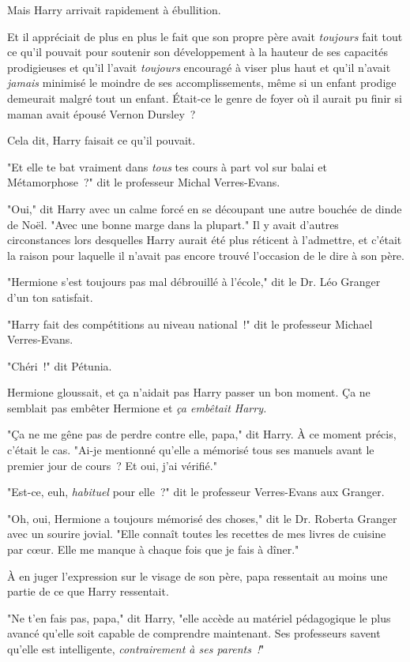 Mais Harry arrivait rapidement à ébullition.

Et il appréciait de plus en plus le fait que son propre père avait \emph{toujours} fait tout ce qu'il pouvait pour soutenir son développement à la hauteur de ses capacités prodigieuses et qu'il l'avait \emph{toujours} encouragé à viser plus haut et qu'il n'avait \emph{jamais} minimisé le moindre de ses accomplissements, même si un enfant prodige demeurait malgré tout un enfant. Était-ce le genre de foyer où il aurait pu finir si maman avait épousé Vernon Dursley~?

Cela dit, Harry faisait ce qu'il pouvait.

"Et elle te bat vraiment dans \emph{tous} tes cours à part vol sur balai et Métamorphose~?" dit le professeur Michal Verres-Evans.

"Oui," dit Harry avec un calme forcé en se découpant une autre bouchée de dinde de Noël. "Avec une bonne marge dans la plupart." Il y avait d'autres circonstances lors desquelles Harry aurait été plus réticent à l'admettre, et c'était la raison pour laquelle il n'avait pas encore trouvé l'occasion de le dire à son père.

"Hermione s'est toujours pas mal débrouillé à l'école," dit le Dr. Léo Granger d'un ton satisfait.

"Harry fait des compétitions au niveau national~!" dit le professeur Michael Verres-Evans.

"Chéri~!" dit Pétunia.

Hermione gloussait, et ça n'aidait pas Harry passer un bon moment. Ça ne semblait pas embêter Hermione et \emph{ça embêtait Harry.}

"Ça ne me gêne pas de perdre contre elle, papa," dit Harry. À ce moment précis, c'était le cas. "Ai-je mentionné qu'elle a mémorisé tous ses manuels avant le premier jour de cours~? Et oui, j'ai vérifié."

"Est-ce, euh, \emph{habituel} pour elle~?" dit le professeur Verres-Evans aux Granger.

"Oh, oui, Hermione a toujours mémorisé des choses," dit le Dr. Roberta Granger avec un sourire jovial. "Elle connaît toutes les recettes de mes livres de cuisine par cœur. Elle me manque à chaque fois que je fais à dîner."

À en juger l'expression sur le visage de son père, papa ressentait au moins une partie de ce que Harry ressentait.

"Ne t'en fais pas, papa," dit Harry, "elle accède au matériel pédagogique le plus avancé qu'elle soit capable de comprendre maintenant. Ses professeurs savent qu'elle est intelligente, \emph{contrairement à ses parents~!}"

